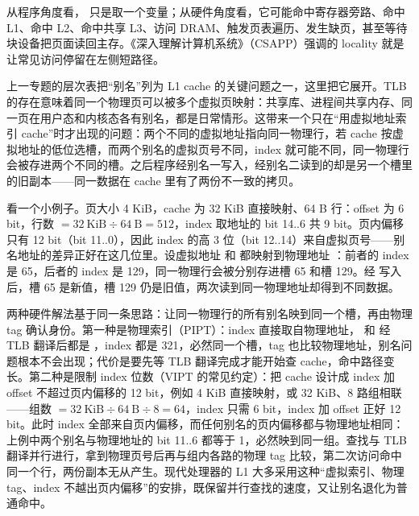 从程序角度看， 只是取一个变量；从硬件角度看，它可能命中寄存器旁路、命中 L1、命中 L2、命中共享 L3、访问 DRAM、触发页表遍历、发生缺页，甚至等待块设备把页面读回主存。《深入理解计算机系统》（CSAPP）强调的 locality 就是让常见访问停留在左侧短路径。

上一专题的层次表把“别名”列为 L1 cache 的关键问题之一，这里把它展开。TLB 的存在意味着同一个物理页可以被多个虚拟页映射：共享库、进程间共享内存、同一页在用户态和内核态各有别名，都是日常情形。这带来一个只在“用虚拟地址索引 cache”时才出现的问题：两个不同的虚拟地址指向同一物理行，若 cache 按虚拟地址的低位选槽，而两个别名的虚拟页号不同，index 就可能不同，同一物理行会被存进两个不同的槽。之后程序经别名一写入，经别名二读到的却是另一个槽里的旧副本——同一数据在 cache 里有了两份不一致的拷贝。

看一个小例子。页大小 4 KiB，cache 为 32 KiB 直接映射、64 B 行：offset 为 6 bit，行数 $=32\ \text{KiB}\div 64\ \text{B}=512$，index 取地址的 bit 14..6 共 9 bit。页内偏移只有 12 bit（bit 11..0），因此 index 的高 3 位（bit 12..14）来自虚拟页号——别名地址的差异正好在这几位里。设虚拟地址  和  都映射到物理地址 ：前者的 index 是 65，后者的 index 是 129，同一物理行会被分别存进槽 65 和槽 129。经  写入后，槽 65 是新值，槽 129 仍是旧值，两次读到同一物理地址却得到不同数据。

两种硬件解法基于同一条思路：让同一物理行的所有别名映到同一个槽，再由物理 tag 确认身份。第一种是物理索引（PIPT）：index 直接取自物理地址， 和  经 TLB 翻译后都是 ，index 都是 321，必然同一个槽，tag 也比较物理地址，别名问题根本不会出现；代价是要先等 TLB 翻译完成才能开始查 cache，命中路径变长。第二种是限制 index 位数（VIPT 的常见约定）：把 cache 设计成 index 加 offset 不超过页内偏移的 12 bit，例如 4 KiB 直接映射，或 32 KiB、8 路组相联——组数 $=32\ \text{KiB}\div 64\ \text{B}\div 8=64$，index 只需 6 bit，index 加 offset 正好 12 bit。此时 index 全部来自页内偏移，而任何别名的页内偏移都与物理地址相同：上例中两个别名与物理地址的 bit 11..6 都等于 1，必然映到同一组。查找与 TLB 翻译并行进行，拿到物理页号后再与组内各路的物理 tag 比较，第二次访问命中同一个行，两份副本无从产生。现代处理器的 L1 大多采用这种“虚拟索引、物理 tag、index 不越出页内偏移”的安排，既保留并行查找的速度，又让别名退化为普通命中。

